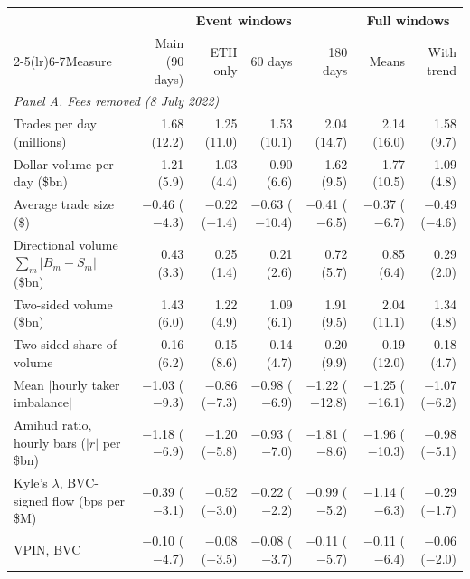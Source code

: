 \begin{tabular}{lrrrrrr}
\toprule
 & \multicolumn{4}{c}{Event windows} & \multicolumn{2}{c}{Full windows}\\
\cmidrule(lr){2-5}\cmidrule(lr){6-7}Measure & Main (90 days) & ETH only & 60 days & 180 days & Means & With trend\\
\midrule
\multicolumn{7}{l}{\emph{Panel A. Fees removed (8 July 2022)}}\\
Trades per day (millions) & 1.68 (12.2) & 1.25 (11.0) & 1.53 (10.1) & 2.04 (14.7) & 2.14 (16.0) & 1.58 (9.7)\\
Dollar volume per day (\$bn) & 1.21 (5.9) & 1.03 (4.4) & 0.90 (6.6) & 1.62 (9.5) & 1.77 (10.5) & 1.09 (4.8)\\
Average trade size (\$) & \ensuremath{-}0.46 (\ensuremath{-}4.3) & \ensuremath{-}0.22 (\ensuremath{-}1.4) & \ensuremath{-}0.63 (\ensuremath{-}10.4) & \ensuremath{-}0.41 (\ensuremath{-}6.5) & \ensuremath{-}0.37 (\ensuremath{-}6.7) & \ensuremath{-}0.49 (\ensuremath{-}4.6)\\
Directional volume $\sum_m|B_m-S_m|$ (\$bn) & 0.43 (3.3) & 0.25 (1.4) & 0.21 (2.6) & 0.72 (5.7) & 0.85 (6.4) & 0.29 (2.0)\\
Two-sided volume (\$bn) & 1.43 (6.0) & 1.22 (4.9) & 1.09 (6.1) & 1.91 (9.5) & 2.04 (11.1) & 1.34 (4.8)\\
Two-sided share of volume & 0.16 (6.2) & 0.15 (8.6) & 0.14 (4.7) & 0.20 (9.9) & 0.19 (12.0) & 0.18 (4.7)\\
Mean $|$hourly taker imbalance$|$ & \ensuremath{-}1.03 (\ensuremath{-}9.3) & \ensuremath{-}0.86 (\ensuremath{-}7.3) & \ensuremath{-}0.98 (\ensuremath{-}6.9) & \ensuremath{-}1.22 (\ensuremath{-}12.8) & \ensuremath{-}1.25 (\ensuremath{-}16.1) & \ensuremath{-}1.07 (\ensuremath{-}6.2)\\
Amihud ratio, hourly bars ($|r|$ per \$bn) & \ensuremath{-}1.18 (\ensuremath{-}6.9) & \ensuremath{-}1.20 (\ensuremath{-}5.8) & \ensuremath{-}0.93 (\ensuremath{-}7.0) & \ensuremath{-}1.81 (\ensuremath{-}8.6) & \ensuremath{-}1.96 (\ensuremath{-}10.3) & \ensuremath{-}0.98 (\ensuremath{-}5.1)\\
Kyle's $\lambda$, BVC-signed flow (bps per \$M) & \ensuremath{-}0.39 (\ensuremath{-}3.1) & \ensuremath{-}0.52 (\ensuremath{-}3.0) & \ensuremath{-}0.22 (\ensuremath{-}2.2) & \ensuremath{-}0.99 (\ensuremath{-}5.2) & \ensuremath{-}1.14 (\ensuremath{-}6.3) & \ensuremath{-}0.29 (\ensuremath{-}1.7)\\
VPIN, BVC & \ensuremath{-}0.10 (\ensuremath{-}4.7) & \ensuremath{-}0.08 (\ensuremath{-}3.5) & \ensuremath{-}0.08 (\ensuremath{-}3.7) & \ensuremath{-}0.11 (\ensuremath{-}5.7) & \ensuremath{-}0.11 (\ensuremath{-}6.4) & \ensuremath{-}0.06 (\ensuremath{-}2.0)\\

\end{tabular}
